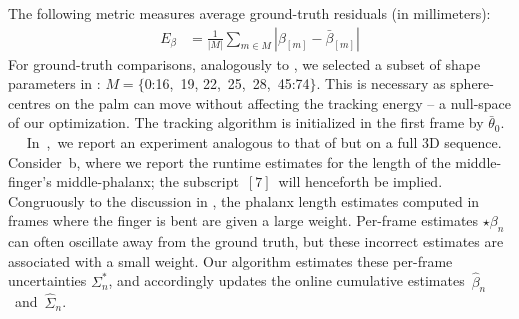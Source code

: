 The following metric measures average ground-truth residuals (in millimeters):
% 
\begin{align}
E_{\beta} &= \tfrac{1}{|M|} \sum_{m \in M} \left| \beta_{[m]} - \bar\beta_{[m]} \right|
\label{eq:metricgt}
\end{align}
% 
For ground-truth comparisons, analogously to \cite{taylor2016joint}, we selected a subset of shape parameters in : $M=\{$0:16,~19, 22,~25,~28,~45:74$\}$. This is necessary as sphere-centres on the palm can move without affecting the tracking energy -- a null-space of our optimization. The tracking algorithm is initialized in the first frame by $\bar\theta_0$.
%
$\quad$
% 
In~,~we report an experiment analogous to that of  but on a full 3D sequence.
Consider~b, where we report the runtime estimates for the length of the middle-finger's middle-phalanx; the subscript~{$[7]$}~will henceforth be implied.
Congruously to the discussion in , the phalanx length
estimates computed in frames where the finger is bent are given a large weight.
Per-frame estimates {\small $\star\beta_n$} can often oscillate away from the ground truth, but these incorrect estimates are associated with a small weight.
% 
Our algorithm estimates these per-frame uncertainties {\small $\Sigma^*_n$}, and accordingly updates the online cumulative estimates~{\small $\hat\beta_n$}~and~{\small $\hat\Sigma_n$}.


